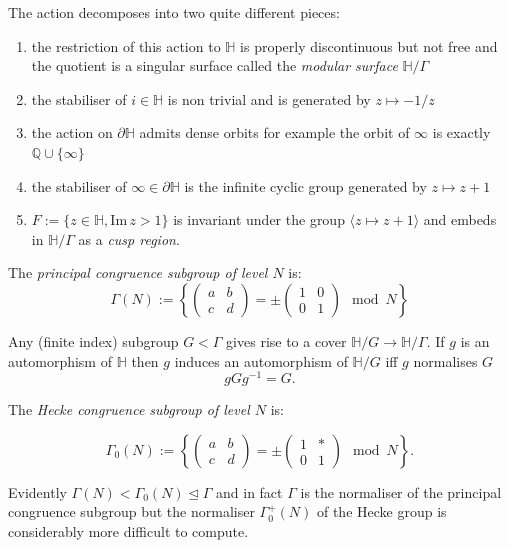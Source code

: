 \documentclass[12pt,a4paper]{amsart}
\def\dHH{\partial \mathbb{H}}
\begin{document}
The action decomposes into two quite different pieces:
\begin{enumerate}
	\item the restriction of this action to $\mathbb{H}$
		is properly discontinuous but not free and the quotient is
		a singular surface called the \textit{modular
		surface} $\mathbb{H}/\Gamma$
	\item	the stabiliser of $i\in \mathbb{H}$ is non
		trivial and is generated by $z\mapsto -1 / z$
	\item the action on $\dHH$ admits dense orbits for
		example the orbit of $\infty$ is exactly
		$\mathbb{Q}\cup \{\infty\}$
	\item the stabiliser of $\infty \in \dHH$ is the
		infinite cyclic group generated by $z\mapsto
		z+1$

	\item $F := \{z\in \mathbb{H}, \mathrm{Im}\,z > 1\}$ is
		invariant under the group $\langle z \mapsto
		z+1 \rangle$  and embeds in
		$\mathbb{H}/\Gamma$ as a \textit{cusp region}.

\end{enumerate}

The \textit{principal congruence subgroup of level $N$} is:
$$ \Gamma(N) := \left \{ \begin{pmatrix} a & b \\ c & d \end{pmatrix} = 
\pm \begin{pmatrix} 1 & 0 \\ 0 & 1 \end{pmatrix} \mod N \right \} 
$$

Any (finite index) subgroup $G < \Gamma$
gives rise to a cover
$\mathbb{H}/G\rightarrow \mathbb{H}/\Gamma$.
If $g$ is an automorphism of $\mathbb{H}$
then $g$ induces an automorphism of $\mathbb{H}/G$
iff $g$ normalises $G$ 
$$gGg^{-1} = G.$$


The \textit{Hecke congruence subgroup of level $N$} is:


$$ \Gamma_0(N) := \left \{ \begin{pmatrix} a & b \\ c & d \end{pmatrix} = 
\pm \begin{pmatrix} 1 & * \\ 0 & 1 \end{pmatrix} \mod N \right \}.$$


Evidently $\Gamma(N) < \Gamma_0(N) \trianglelefteq \Gamma$  
and in fact $\Gamma$ is the normaliser of the principal congruence
subgroup but the normaliser $\Gamma_0^+(N)$ of the Hecke group  is
considerably more difficult to compute.
\end{document}
